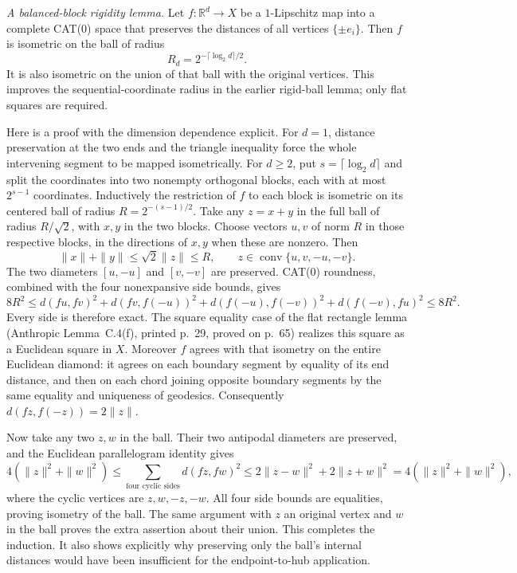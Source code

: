 \emph{A balanced-block rigidity lemma.}
Let $f:\mathbb R^d\to X$ be a $1$-Lipschitz map into a complete CAT(0)
space that preserves the distances of all vertices $\{\pm e_i\}$.
Then $f$ is isometric on the ball of radius
\[
                     R_d=2^{-\lceil\log_2d\rceil/2}.
 \tag{EX43.5}
\]
It is also isometric on the union of that ball with the original
vertices. This improves the sequential-coordinate radius in the
earlier rigid-ball lemma; only flat squares are required.

Here is a proof with the dimension dependence explicit. For $d=1$,
distance preservation at the two ends and the triangle inequality
force the whole intervening segment to be mapped isometrically.
For $d\ge2$, put $s=\lceil\log_2d\rceil$ and split the coordinates
into two nonempty orthogonal blocks, each with at most $2^{s-1}$
coordinates. Inductively the restriction of $f$ to each block is
isometric on its centered ball of radius
$R=2^{-(s-1)/2}$. Take any $z=x+y$ in the full ball of radius
$R/\sqrt2$, with $x,y$ in the two blocks. Choose vectors $u,v$ of
norm $R$ in those respective blocks, in the directions of $x,y$
when these are nonzero. Then
\[
 \|x\|+\|y\|\le\sqrt2\|z\|\le R,
 \qquad z\in\operatorname{conv}\{u,v,-u,-v\}.
\]
The two diameters $[u,-u]$ and $[v,-v]$ are preserved. CAT(0)
roundness, combined with the four nonexpansive side bounds, gives
\[
 8R^2\le d(fu,fv)^2+d(fv,f(-u))^2
            +d(f(-u),f(-v))^2+d(f(-v),fu)^2\le8R^2.
\]
Every side is therefore exact. The square equality case of the flat
rectangle lemma (Anthropic Lemma~C.4(f), printed p.~29, proved on
p.~65) realizes this square as a Euclidean square in $X$.
Moreover $f$ agrees with that isometry on the entire Euclidean
diamond: it agrees on each boundary segment by equality of its end
distance, and then on each chord joining opposite boundary segments
by the same equality and uniqueness of geodesics. Consequently
$d(fz,f(-z))=2\|z\|$.

Now take any two $z,w$ in the ball. Their two antipodal diameters
are preserved, and the Euclidean parallelogram identity gives
\[
 4(\|z\|^2+\|w\|^2)
 \le\sum_{\text{four cyclic sides}}d(fz,fw)^2
 \le2\|z-w\|^2+2\|z+w\|^2
 =4(\|z\|^2+\|w\|^2),
\]
where the cyclic vertices are $z,w,-z,-w$. All four side bounds
are equalities, proving isometry of the ball. The same argument
with $z$ an original vertex and $w$ in the ball proves the extra
assertion about their union. This completes the induction. It also
shows explicitly why preserving only the ball's internal distances
would have been insufficient for the endpoint-to-hub application.

